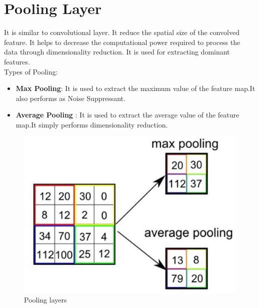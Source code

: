         \section{Pooling Layer}
            It is similar to convolutional layer. It reduce the spatial size of the convolved feature. It helps to decrease the computational power required to process the data through dimensionality reduction. It is used for extracting dominant features.\\
            Types of Pooling:
            \begin{itemize}
                \item \textbf{Max Pooling}: It is used to extract the maximum value of the feature map.It also performs as Noise Suppressant.
                \item \textbf{Average Pooling} : It is used to extract the average value of the feature map.It simply performs dimensionality reduction.
            \end{itemize} 
            \begin{figure}[h]                 
                \centering                 
                \includegraphics[width=.5\textwidth]{img/experiment/pooling_layers.png}                 
                \caption{Pooling layers}                 
                \label{fig:Pooling layers}         
            \end{figure}